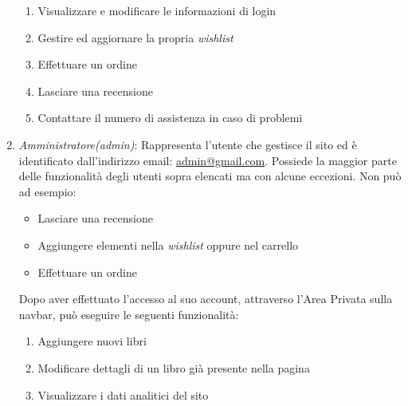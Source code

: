 \begin{enumerate}
\begin{enumerate}[label*=\arabic*.]
				\item Visualizzare e modificare le informazioni di login 
				\item Gestire ed aggiornare la propria \textit{wishlist}
				\item Effettuare un ordine
				\item Lasciare una recensione
				\item Contattare il numero di assistenza in caso di problemi
			\end{enumerate}
	\item \textit{Amministratore(admin)}: Rappresenta l’utente che gestisce il sito ed è identificato dall’indirizzo email: \underline{admin@gmail.com}. Possiede la maggior parte delle funzionalità degli utenti sopra elencati ma con alcune eccezioni. Non può ad esempio:
		\begin{itemize}
			\item Lasciare una recensione
			\item Aggiungere elementi nella \textit{wishlist} oppure nel carrello
			\item Effettuare un ordine
		\end{itemize}
Dopo aver effettuato l’accesso al suo account, attraverso l’Area Privata sulla navbar, può eseguire le seguenti funzionalità:
		\begin{enumerate}[label*=\arabic*.]
			\item Aggiungere nuovi libri
			\item Modificare dettagli di un libro già presente nella pagina 
			\item Visualizzare i dati analitici del sito
		\end{enumerate}
\end{enumerate}